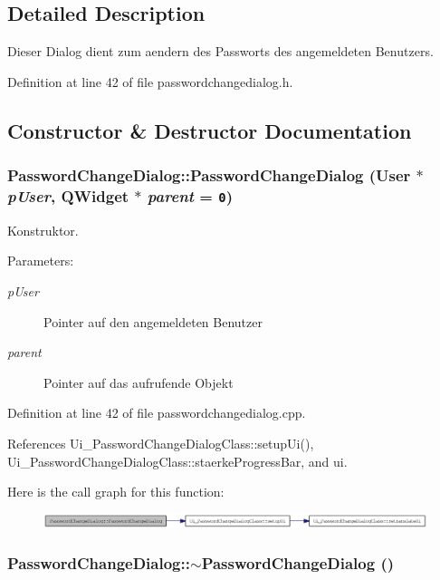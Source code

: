 \subsection{Detailed Description}
Dieser Dialog dient zum aendern des Passworts des angemeldeten Benutzers. 

Definition at line 42 of file passwordchangedialog.h.

\subsection{Constructor \& Destructor Documentation}
\hypertarget{class_password_change_dialog_4a3b2b3c08acbfb3163084c6ac80cbe4}{
\subsubsection[PasswordChangeDialog]{\setlength{\rightskip}{0pt plus 5cm}PasswordChangeDialog::PasswordChangeDialog ({\bf User} $\ast$ {\em pUser}, \/  QWidget $\ast$ {\em parent} = {\tt 0})}}
\label{class_password_change_dialog_4a3b2b3c08acbfb3163084c6ac80cbe4}


Konstruktor. 

\begin{Desc}
\item[Parameters:]
\begin{description}
\item[{\em pUser}]Pointer auf den angemeldeten Benutzer \item[{\em parent}]Pointer auf das aufrufende Objekt \end{description}
\end{Desc}


Definition at line 42 of file passwordchangedialog.cpp.

References Ui\_\-PasswordChangeDialogClass::setupUi(), Ui\_\-PasswordChangeDialogClass::staerkeProgressBar, and ui.

Here is the call graph for this function:\nopagebreak
\begin{figure}[H]
\begin{center}
\leavevmode
\includegraphics[width=381pt]{class_password_change_dialog_4a3b2b3c08acbfb3163084c6ac80cbe4_cgraph}
\end{center}
\end{figure}
\hypertarget{class_password_change_dialog_fadac897a16f4963b110ffab35efc771}{
\subsubsection[$\sim$PasswordChangeDialog]{\setlength{\rightskip}{0pt plus 5cm}PasswordChangeDialog::$\sim$PasswordChangeDialog ()}}
\label{class_password_change_dialog_fadac897a16f4963b110ffab35efc771}


